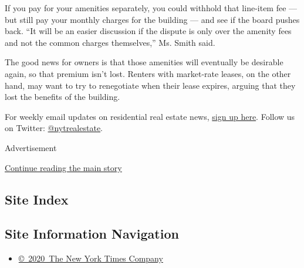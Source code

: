 If you pay for your amenities separately, you could withhold that
line-item fee --- but still pay your monthly charges for the building
--- and see if the board pushes back. ``It will be an easier discussion
if the dispute is only over the amenity fees and not the common charges
themselves,'' Ms. Smith said.

The good news for owners is that those amenities will eventually be
desirable again, so that premium isn't lost. Renters with market-rate
leases, on the other hand, may want to try to renegotiate when their
lease expires, arguing that they lost the benefits of the building.

For weekly email updates on residential real estate news,
\href{http://www.nytimes.com/newsletters/realestate/}{sign up here}.
Follow us on Twitter:
\href{https://twitter.com/nytrealestate}{@nytrealestate}.

Advertisement

\protect\hyperlink{after-bottom}{Continue reading the main story}

\hypertarget{site-index}{%
\subsection{Site Index}\label{site-index}}

\hypertarget{site-information-navigation}{%
\subsection{Site Information
Navigation}\label{site-information-navigation}}

\begin{itemize}
\tightlist
\item
  \href{https://help.nytimes.com/hc/en-us/articles/115014792127-Copyright-notice}{©~2020~The
  New York Times Company}
\end{itemize}

